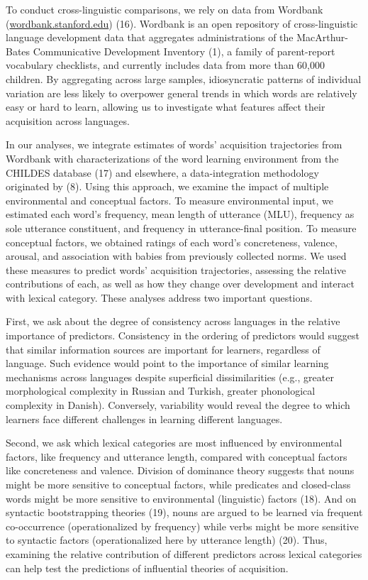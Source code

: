 \documentclass[english,man]{apa6}
\theoremstyle{definition}
\theoremstyle{definition}
\theoremstyle{definition}
\theoremstyle{remark}
\begin{document}
To conduct cross-linguistic comparisons, we rely on data from Wordbank
(\href{http://wordbank.stanford.edu}{wordbank.stanford.edu}) (16).
Wordbank is an open repository of cross-linguistic language development
data that aggregates administrations of the MacArthur-Bates
Communicative Development Inventory (1), a family of parent-report
vocabulary checklists, and currently includes data from more than 60,000
children. By aggregating across large samples, idiosyncratic patterns of
individual variation are less likely to overpower general trends in
which words are relatively easy or hard to learn, allowing us to
investigate what features affect their acquisition across languages.

In our analyses, we integrate estimates of words' acquisition
trajectories from Wordbank with characterizations of the word learning
environment from the CHILDES database (17) and elsewhere, a
data-integration methodology originated by (8). Using this approach, we
examine the impact of multiple environmental and conceptual factors. To
measure environmental input, we estimated each word's frequency, mean
length of utterance (MLU), frequency as sole utterance constituent, and
frequency in utterance-final position. To measure conceptual factors, we
obtained ratings of each word's concreteness, valence, arousal, and
association with babies from previously collected norms. We used these
measures to predict words' acquisition trajectories, assessing the
relative contributions of each, as well as how they change over
development and interact with lexical category. These analyses address
two important questions.

First, we ask about the degree of consistency across languages in the
relative importance of predictors. Consistency in the ordering of
predictors would suggest that similar information sources are important
for learners, regardless of language. Such evidence would point to the
importance of similar learning mechanisms across languages despite
superficial dissimilarities (e.g., greater morphological complexity in
Russian and Turkish, greater phonological complexity in Danish).
Conversely, variability would reveal the degree to which learners face
different challenges in learning different languages.

Second, we ask which lexical categories are most influenced by
environmental factors, like frequency and utterance length, compared
with conceptual factors like concreteness and valence. Division of
dominance theory suggests that nouns might be more sensitive to
conceptual factors, while predicates and closed-class words might be
more sensitive to environmental (linguistic) factors (18). And on
syntactic bootstrapping theories (19), nouns are argued to be learned
via frequent co-occurrence (operationalized by frequency) while verbs
might be more sensitive to syntactic factors (operationalized here by
utterance length) (20). Thus, examining the relative contribution of
different predictors across lexical categories can help test the
predictions of influential theories of acquisition.
\end{document}
